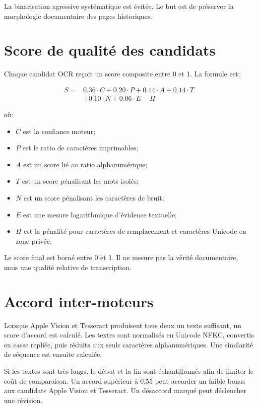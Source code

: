 \documentclass[11pt,a4paper]{article}
\begin{document}
La binarisation agressive systématique est évitée. Le but est de préserver la morphologie documentaire des pages historiques.

\section{Score de qualité des candidats}

Chaque candidat OCR reçoit un score composite entre 0 et 1. La formule est:

\begin{equation}
\label{eq:score}
\begin{split}
S ={}& 0.36 \cdot C
+ 0.20 \cdot P
+ 0.14 \cdot A
+ 0.14 \cdot T \\
&+ 0.10 \cdot N
+ 0.06 \cdot E
- \Pi
\end{split}
\end{equation}

où:

\begin{itemize}
  \item \(C\) est la confiance moteur;
  \item \(P\) est le ratio de caractères imprimables;
  \item \(A\) est un score lié au ratio alphanumérique;
  \item \(T\) est un score pénalisant les mots isolés;
  \item \(N\) est un score pénalisant les caractères de bruit;
  \item \(E\) est une mesure logarithmique d'évidence textuelle;
  \item \(\Pi\) est la pénalité pour caractères de remplacement et caractères Unicode en zone privée.
\end{itemize}

Le score final est borné entre 0 et 1. Il ne mesure pas la vérité documentaire, mais une qualité relative de transcription.

\section{Accord inter-moteurs}

Lorsque Apple Vision et Tesseract produisent tous deux un texte suffisant, un score d'accord est calculé. Les textes sont normalisés en Unicode NFKC, convertis en casse repliée, puis réduits aux seuls caractères alphanumériques. Une similarité de séquence est ensuite calculée.

Si les textes sont très longs, le début et la fin sont échantillonnés afin de limiter le coût de comparaison. Un accord supérieur à 0,55 peut accorder un faible bonus aux candidats Apple Vision et Tesseract. Un désaccord marqué peut déclencher une révision.
\end{document}
